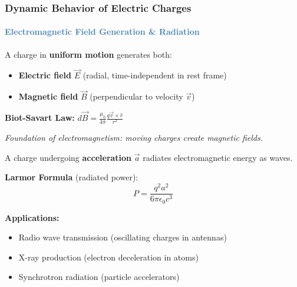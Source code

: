 \begin{frame}
\frametitle{\textsf{\textbf{Dynamic Behavior of Electric Charges}}}
\framesubtitle{\textcolor{steelblue}{Electromagnetic Field Generation \& Radiation}}

\vspace{-0.05cm}

\begin{keybox}
\vspace{0.1cm}
A charge in \textbf{uniform motion} generates both:
\begin{itemize}
    \item \textbf{Electric field} $\vec{E}$ (radial, time-independent in rest frame)
    \item \textbf{Magnetic field} $\vec{B}$ (perpendicular to velocity $\vec{v}$)
\end{itemize}
\vspace{0.15cm}
\begin{center}
\textbf{Biot-Savart Law:} \quad $\displaystyle d\vec{B} = \frac{\mu_0}{4\pi} \frac{q\vec{v} \times \hat{r}}{r^2}$
\end{center}
\textit{Foundation of electromagnetism: moving charges create magnetic fields.}
\end{keybox}

\vspace{0.3cm}

\begin{importantbox}
\vspace{0.1cm}
A charge undergoing \textbf{acceleration} $\vec{a}$ radiates electromagnetic energy as waves.

\vspace{0.2cm}

\textbf{Larmor Formula} (radiated power):
\begin{equation*}
\boxed{P = \frac{q^2 a^2}{6\pi\epsilon_0 c^3}}
\end{equation*}

\vspace{0.2cm}

\textbf{Applications:}
\begin{itemize}
    \item \textcolor{accentorange}{} Radio wave transmission (oscillating charges in antennas)
    \item \textcolor{accentorange}{} X-ray production (electron deceleration in atoms)
    \item \textcolor{accentorange}{} Synchrotron radiation (particle accelerators)
\end{itemize}
\end{importantbox}


\end{frame}
